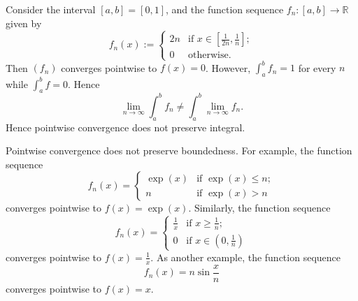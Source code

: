 \begin{exm}
  \label{exm:pointwiseConvergencePreservesNoIntegral}
  Consider the interval $[a,b]=[0,1]$,
  and the function sequence $f_n:[a,b]\rightarrow\mathbb{R}$
  given by
   \begin{displaymath}
     f_n(x) := 
     \begin{cases}
       2n & \text{if } x\in \left[\frac{1}{2n}, \frac{1}{n}\right];
       \\
       0  & \text{otherwise}.
     \end{cases}
   \end{displaymath}
  Then $(f_n)$ converges pointwise to $f(x)=0$.
  However, $\int_a^b f_n = 1$ for every $n$
   while $\int_a^b f = 0$. Hence
   \begin{displaymath}
     \lim_{n\rightarrow \infty} \int_{a}^b f_n
     \ne \int_a^b \lim_{n\rightarrow \infty} f_n.
   \end{displaymath}
  Hence pointwise convergence does not preserve integral.
\end{exm}

\begin{exm}
  \label{exm:pointwiseConvergencePreservesNoBoundedness}
  Pointwise convergence does not preserve boundedness.
  For example, the function sequence
  \begin{equation}
    \label{eq:choppedExp}
    f_n(x) =
    \begin{cases}
      \exp(x) & \text{if } \exp(x)\le n;
      \\
      n & \text{if } \exp(x)>n
    \end{cases}
  \end{equation}
  converges pointwise to $f(x)=\exp(x)$. %
  Similarly, the function sequence
  \begin{equation}
    \label{eq:choppedReciprocal}
    f_n(x) =
    \begin{cases}
      \frac{1}{x} & \text{if } x \ge \frac{1}{n};
      \\
      0 & \text{if } x\in (0,\frac{1}{n})
    \end{cases}
  \end{equation}
  converges pointwise to $f(x)=\frac{1}{x}$.
  As another example, the function sequence 
  \begin{equation}
    \label{eq:nSin}
    f_n(x) = n\sin \frac{x}{n}
  \end{equation}
  converges pointwise to $f(x)=x$.
\end{exm}

